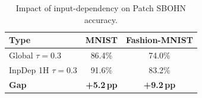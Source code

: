 \begin{table}[h]
\centering
\caption{Impact of input-dependency on Patch SBOHN accuracy.}
\begin{tabular}{lcc}
\hline
\textbf{Type} & \textbf{MNIST} & \textbf{Fashion-MNIST} \\
\hline
Global $\tau{=}0.3$ & 86.4\% & 74.0\% \\
InpDep 1H $\tau{=}0.3$ & 91.6\% & 83.2\% \\
\textbf{Gap} & \textbf{+5.2\,pp} & \textbf{+9.2\,pp} \\
\hline
\end{tabular}
\end{table}
